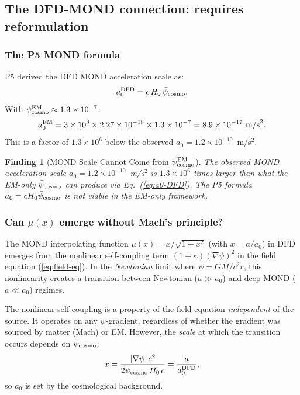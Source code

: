 \documentclass[11pt]{article}
\newtheorem{finding}{Finding}
\newcommand{\ee}[1]{\times 10^{#1}}
\newcommand{\psicosmo}{\bar{\psi}_{\rm cosmo}}
\begin{document}
\subsection{The DFD-MOND connection: requires reformulation}

\subsubsection{The P5 MOND formula}

P5 derived the DFD MOND acceleration scale as:
\begin{equation}
a_0^{\rm DFD} = c\,H_0\,\psicosmo.
\label{eq:a0-DFD}
\end{equation}
With $\psicosmo^{\rm EM} \approx 1.3\ee{-7}$:
\begin{equation}
a_0^{\rm EM} = 3\ee{8}\times2.27\ee{-18}\times1.3\ee{-7}
= 8.9\ee{-17}~\text{m/s}^2.
\label{eq:a0-EM}
\end{equation}
This is a factor of $1.3\ee{6}$ below the observed $a_0 = 1.2\ee{-10}$~m/s$^2$.

\begin{finding}[MOND Scale Cannot Come from $\psicosmo^{\rm EM}$]
\label{find:MOND-lost}
The observed MOND acceleration scale $a_0 = 1.2\ee{-10}$~m/s$^2$ is
$1.3\ee{6}$ times larger than what the EM-only $\psicosmo$ can produce
via Eq.~(\ref{eq:a0-DFD}). The P5 formula $a_0 = cH_0\psicosmo$ is
\emph{not viable} in the EM-only framework.
\end{finding}

\subsubsection{Can $\mu(x)$ emerge without Mach's principle?}

The MOND interpolating function $\mu(x) = x/\sqrt{1+x^2}$ (with
$x = a/a_0$) in DFD emerges from the nonlinear self-coupling term
$(1+\kappa)(\nabla\psi)^2$ in the field equation (\ref{eq:field-eq}).
In the \emph{Newtonian} limit where $\psi = GM/c^2r$, this nonlinearity
creates a transition between Newtonian ($a \gg a_0$) and deep-MOND
($a \ll a_0$) regimes.

The nonlinear self-coupling is a property of the field equation
\emph{independent} of the source. It operates on any $\psi$-gradient,
regardless of whether the gradient was sourced by matter (Mach) or EM.
However, the \emph{scale} at which the transition occurs depends on
$\psicosmo$:
\begin{equation}
x = \frac{|\nabla\psi|\,c^2}{2\psicosmo\,H_0\,c}
= \frac{a}{a_0^{\rm DFD}},
\end{equation}
so $a_0$ is set by the cosmological background.
\end{document}
